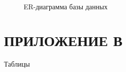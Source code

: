 \begin{figure}[p]
\centering
{}
\caption{ER-диаграмма базы данных}
\label{fig:design-er}
\end{figure}

\chapter[ПРИЛОЖЕНИЕ В]{{\fontsize{14pt}{21pt}\selectfont\MakeUppercase{ПРИЛОЖЕНИЕ В}}}
\label{cha:appendix-tables}
\begin{center}
{\normalfont\fontsize{14pt}{21pt}\selectfont Таблицы}
\end{center}
\setcounter{table}{0}
\renewcommand{\thetable}{В.\arabic{table}}
\renewcommand{\theHtable}{appendix-c.\arabic{table}}

